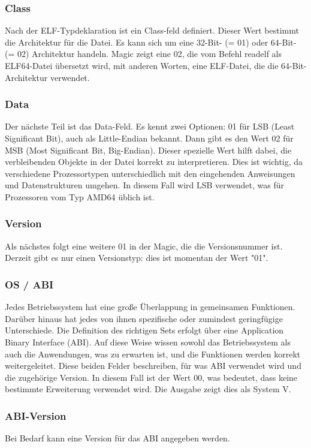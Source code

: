 \subsubsection{Class}
Nach der ELF-Typdeklaration ist ein Class-feld definiert. Dieser Wert bestimmt die Architektur für die Datei. Es kann sich um eine 32-Bit- (= 01) oder 64-Bit- (= 02) Architektur handeln. Magic zeigt eine 02, die vom Befehl readelf als ELF64-Datei übersetzt wird, mit anderen Worten, eine ELF-Datei, die die 64-Bit-Architektur verwendet.

\subsubsection{Data}
Der nächste Teil ist das Data-Feld. Es kennt zwei Optionen: 01 für LSB (Least Significant Bit), auch als Little-Endian bekannt. Dann gibt es den Wert 02 für MSB (Most Significant Bit, Big-Endian). Dieser spezielle Wert hilft dabei, die verbleibenden Objekte in der Datei korrekt zu interpretieren. Dies ist wichtig, da verschiedene Prozessortypen unterschiedlich mit den eingehenden Anweisungen und Datenstrukturen umgehen. In diesem Fall wird LSB verwendet, was für Prozessoren vom Typ AMD64 üblich ist.

\subsubsection{Version}
Als nächstes folgt eine weitere {\grqq}01{\grqq} in der Magic, die die Versionsnummer ist. Derzeit gibt es nur einen Versionstyp: dies ist momentan der Wert "01".

\subsubsection{OS / ABI}
Jedes Betriebssystem hat eine große Überlappung in gemeinsamen Funktionen. Darüber hinaus hat jedes von ihnen spezifische oder zumindest geringfügige Unterschiede. Die Definition des richtigen Sets erfolgt über eine Application Binary Interface (ABI). Auf diese Weise wissen sowohl das Betriebssystem als auch die Anwendungen, was zu erwarten ist, und die Funktionen werden korrekt weitergeleitet. Diese beiden Felder beschreiben, für was ABI verwendet wird und die zugehörige Version. In diesem Fall ist der Wert 00, was bedeutet, dass keine bestimmte Erweiterung verwendet wird. Die Ausgabe zeigt dies als System V.

\subsubsection{ABI-Version}
Bei Bedarf kann eine Version für das ABI angegeben werden.

